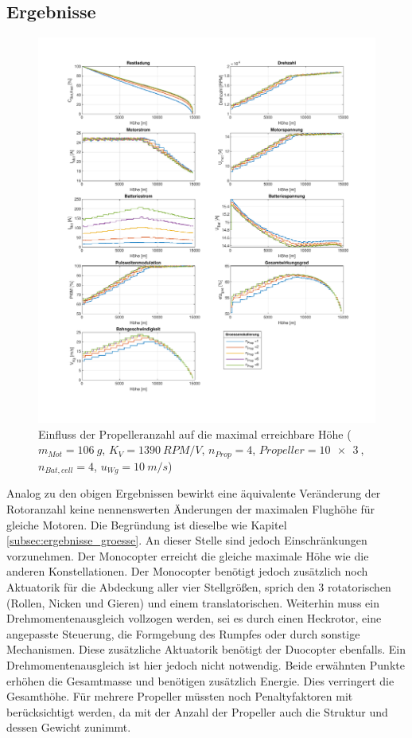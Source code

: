 \subsection{Ergebnisse}
\begin{figure}[H]
	\includegraphics[scale=0.7]{Diagramme/Anz_Prop.pdf}
	\caption{Einfluss der Propelleranzahl auf die maximal erreichbare Höhe (\ensuremath{m_{Mot}=\SI{106}{g}}, \ensuremath{K_V=\SI{1390}{RPM/V}}, \ensuremath{n_{Prop}=4}, \ensuremath{Propeller=\SI{10x3}{}}, \ensuremath{n_{Bat,cell}=4}, \ensuremath{u_{Wg}=\SI{10}{m/s}})}
	\label{abb:groessenskalierung}
\end{figure}
Analog zu den obigen Ergebnissen bewirkt eine äquivalente Veränderung der Rotoranzahl keine nennenswerten Änderungen der maximalen Flughöhe für gleiche Motoren. Die Begründung ist dieselbe wie Kapitel \ref{subsec:ergebnisse_groesse}. An dieser Stelle sind jedoch Einschränkungen vorzunehmen. 
Der Monocopter erreicht die gleiche maximale Höhe wie die anderen Konstellationen. Der Monocopter benötigt jedoch zusätzlich noch Aktuatorik für die Abdeckung aller vier Stellgrößen, sprich den 3 rotatorischen (Rollen, Nicken und Gieren) und einem translatorischen. Weiterhin muss ein Drehmomentenausgleich vollzogen werden, sei es durch einen Heckrotor, eine angepasste Steuerung, die Formgebung des Rumpfes oder durch sonstige Mechanismen.
Diese zusätzliche Aktuatorik benötigt der Duocopter ebenfalls. Ein Drehmomentenausgleich ist hier jedoch nicht notwendig.
Beide erwähnten Punkte erhöhen die Gesamtmasse und benötigen zusätzlich Energie. Dies verringert die Gesamthöhe. 
Für mehrere Propeller müssten noch Penaltyfaktoren mit berücksichtigt werden, da mit der Anzahl der Propeller auch die Struktur und dessen Gewicht zunimmt. 

